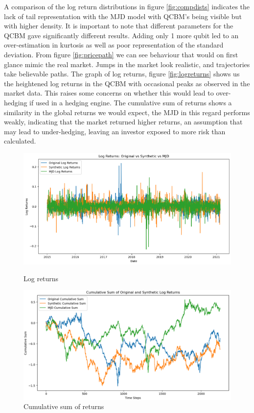 \documentclass[12pt]{article}
\numberwithin{equation}{section}
\begin{document}
A comparison of the log return distributions in figure \ref{fig:compdists}  
indicates the lack of tail representation 
with the MJD model with QCBM's being visible but with higher density. 
It is important to note that different parameters for the QCBM 
gave significantly different results. Adding only 1 more qubit led to an 
over-estimation in kurtosis as well as poor representation of the standard 
deviation. From figure \ref{fig:pricepath} we can see behaviour that would on 
first glance mimic the real market. Jumps in the market look realistic, and 
trajectories take believable paths. The graph of log returns, figure \ref{fig:logreturns} 
shows us the heightened 
log returns in the QCBM with occasional peaks as observed in the market data.
This raises some concerns on whether this would lead to over-hedging if used in 
a hedging engine. The cumulative sum of returns shows a similarity in the global 
returns we would expect, the MJD in this regard performs weakly, indicating that 
the market returned higher returns, an assumption that may lead to under-hedging,
leaving an investor exposed to more risk than calculated. 

\begin{figure}[h!]
    \centering
    \begin{minipage}{0.48\textwidth}
        \centering
        \includegraphics[width=\linewidth]{logreturns.png}
        \caption{Log returns}
        \label{fig:logreturns}
    \end{minipage}
    \hfill
    \begin{minipage}{0.48\textwidth}
        \centering
        \includegraphics[width=\linewidth]{cumsum.png}
        \caption{Cumulative sum of returns}
        \label{fig:cumsum}
    \end{minipage}
\end{figure}
\end{document}

